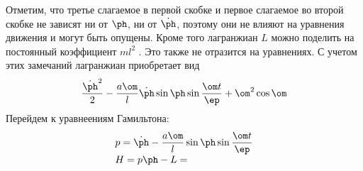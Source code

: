 \documentclass[a4paper,12pt]{article}
\begin{document}
Отметим, что третье слагаемое в первой скобке и первое слагаемое во
второй скобке не зависят ни от $\ph$, ни от $\dot\ph$, поэтому они не
влияют на уравнения движения и могут быть опущены. Кроме того
лагранжиан $L$ можно поделить на постоянный коэффициент $ml^2$ . Это
также не отразится на уравнениях. С учетом этих замечаний лагранжиан
приобретает вид
\begin{displaymath}
  \frac{{\dot\ph}^2}{2} - \frac{a\om}{l}\dot\ph\sin\ph\sin\hzz + \om^2\cos\om
\end{displaymath}
Перейдем к уравнеениям Гамильтона:
\tbk
\begin{displaymath}
  \begin{array}{l}
    \displaystyle
    p = \dot\ph - \frac{a\om}{l}\sin\ph\sin\hzz\\
    H = p\ph - L =
  \end{array}
\end{displaymath}
\end{document}
